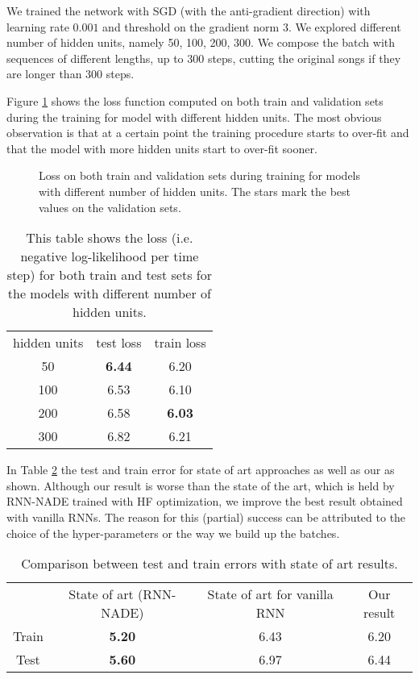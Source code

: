 We trained the network with SGD (with the anti-gradient direction) with learning rate $0.001$ and threshold on the gradient norm $3$. We explored different number of hidden units, namely 50, 100, 200, 300. We compose the batch with sequences of different lengths, up to 300 steps, cutting the original songs if they are longer than 300 steps.

Figure \ref{fig:overfitting_muse} shows the loss function computed on both train and validation sets during the training for model with different hidden units. The most obvious observation is that at a certain point the training procedure starts to over-fit and that the model with more hidden units start to over-fit sooner.

\begin{figure}
	\centering
\resizebox{13cm}{!}{
	
}
\caption{Loss on both train and validation sets during training for models with different number of hidden units. The stars mark the best values on the validation sets.}
\label{fig:overfitting_muse}
\end{figure}

\begin{table}
	\centering
\begin{tabular}{c | c | c}
	hidden units & test loss & train loss \\
	50 & \textbf{6.44} & 6.20  \\
	100 & 6.53 & 6.10 \\
	200 & 6.58 & \textbf{6.03} \\
	300 & 6.82 & 6.21 \\
\end{tabular}
\caption{This table shows the loss (i.e. negative log-likelihood per time step) for both train and test sets for the models with different number of hidden units.}
\label{table:losses_n_hidden}
\end{table}

In Table \ref{table:muse_state_of_art} the test and train error for state of art approaches as well as our as shown. Although our result is worse than the state of the art, which is held by RNN-NADE\cite{BoulangerMuse} trained with HF optimization,  we improve the best result obtained with vanilla RNNs. The reason for this (partial) success can be attributed to the choice of the hyper-parameters or the way we build up the batches.

\begin{table}
	\centering
	\begin{tabular}{c | c | c | c}
		& State of art (RNN-NADE) & State of art for vanilla RNN & Our result\\
		Train & \textbf{5.20} & 6.43 & 6.20\\
		Test & \textbf{5.60} & 6.97 & 6.44\\
	\end{tabular}
	\caption{Comparison between test and train errors with state of art results.}
	\label{table:muse_state_of_art}
	
\end{table}

